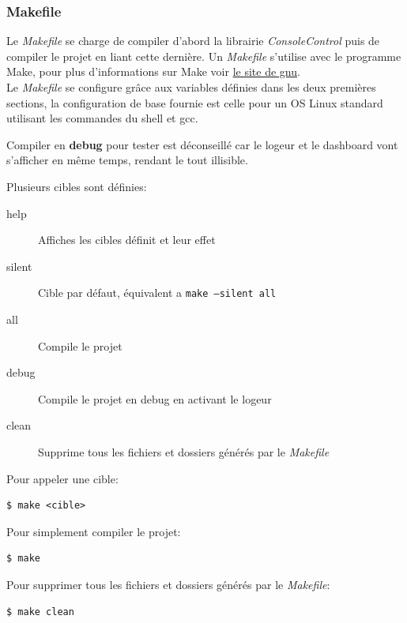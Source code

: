 \documentclass[article, backcover, french, nodocumentinfo]{upmethodology-document}
\begin{document}
			\subsubsection{Makefile}
				Le \textit{Makefile} se charge de compiler d'abord la librairie \textit{ConsoleControl} puis de compiler le projet en liant cette dernière. Un \textit{Makefile} s'utilise avec le programme Make, pour plus d'informations sur Make voir \href{https://www.gnu.org/software/make/}{le site de gnu}.\\
				Le \textit{Makefile} se configure grâce aux variables définies dans les deux premières sections, la configuration de base fournie est celle pour un OS Linux standard utilisant les commandes du shell et gcc.
				\begin{upmcaution}
					Compiler en \textbf{debug} pour tester est déconseillé car le logeur et le dashboard vont s'afficher en même temps, rendant le tout illisible.
				\end{upmcaution}
					Plusieurs cibles sont définies:
					\begin{description}
						\item[help] Affiches les cibles définit et leur effet
						\item[silent] Cible par défaut, équivalent a \texttt{make --silent all}
						\item[all] Compile le projet
						\item[debug] Compile le projet en debug en activant le logeur
						\item[clean] Supprime tous les fichiers et dossiers générés par le \textit{Makefile}
					\end{description}
					Pour appeler une cible:
					\begin{lstlisting}[breaklines=true,breakatwhitespace=true,breakindent=0pt,columns=fixed,keepspaces=true,frame=single,basicstyle=\footnotesize\sffamily]
$ make <cible>\end{lstlisting}
					Pour simplement compiler le projet:
					\begin{lstlisting}[breaklines=true,breakatwhitespace=true,breakindent=0pt,columns=fixed,keepspaces=true,frame=single,basicstyle=\footnotesize\sffamily]
$ make\end{lstlisting}
					Pour supprimer tous les fichiers et dossiers générés par le \textit{Makefile}:
					\begin{lstlisting}[breaklines=true,breakatwhitespace=true,breakindent=0pt,columns=fixed,keepspaces=true,frame=single,basicstyle=\footnotesize\sffamily]
$ make clean\end{lstlisting}
\end{document}
